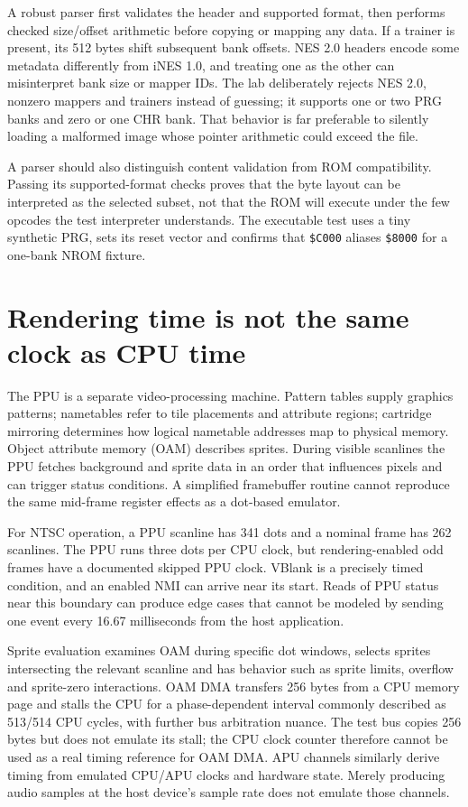 A robust parser first validates the header and supported format, then performs checked size/offset arithmetic before copying or mapping any data. If a trainer is present, its 512 bytes shift subsequent bank offsets. NES 2.0 headers encode some metadata differently from iNES 1.0, and treating one as the other can misinterpret bank size or mapper IDs. The lab deliberately rejects NES 2.0, nonzero mappers and trainers instead of guessing; it supports one or two PRG banks and zero or one CHR bank. That behavior is far preferable to silently loading a malformed image whose pointer arithmetic could exceed the file.

A parser should also distinguish content validation from ROM compatibility. Passing its supported-format checks proves that the byte layout can be interpreted as the selected subset, not that the ROM will execute under the few opcodes the test interpreter understands. The executable test uses a tiny synthetic PRG, sets its reset vector and confirms that \texttt{\$C000} aliases \texttt{\$8000} for a one-bank NROM fixture.

\section{Rendering time is not the same clock as CPU time}\label{06-engine-ii-ch042-rendering-time-is-not-the-same-clock-as-cpu-time}

The PPU is a separate video-processing machine. Pattern tables supply graphics patterns; nametables refer to tile placements and attribute regions; cartridge mirroring determines how logical nametable addresses map to physical memory. Object attribute memory (OAM) describes sprites. During visible scanlines the PPU fetches background and sprite data in an order that influences pixels and can trigger status conditions. A simplified framebuffer routine cannot reproduce the same mid-frame register effects as a dot-based emulator.

For NTSC operation, a PPU scanline has 341 dots and a nominal frame has 262 scanlines. The PPU runs three dots per CPU clock, but rendering-enabled odd frames have a documented skipped PPU clock. VBlank is a precisely timed condition, and an enabled NMI can arrive near its start. Reads of PPU status near this boundary can produce edge cases that cannot be modeled by sending one event every 16.67 milliseconds from the host application.

Sprite evaluation examines OAM during specific dot windows, selects sprites intersecting the relevant scanline and has behavior such as sprite limits, overflow and sprite-zero interactions. OAM DMA transfers 256 bytes from a CPU memory page and stalls the CPU for a phase-dependent interval commonly described as 513/514 CPU cycles, with further bus arbitration nuance. The test bus copies 256 bytes but does not emulate its stall; the CPU clock counter therefore cannot be used as a real timing reference for OAM DMA. APU channels similarly derive timing from emulated CPU/APU clocks and hardware state. Merely producing audio samples at the host device's sample rate does not emulate those channels.

